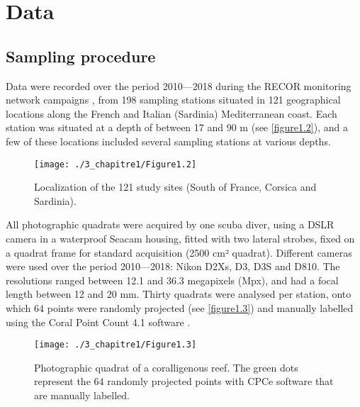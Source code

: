\section{Data}\label{chapitre1_3}

\subsection{Sampling procedure}\label{chapitre1_3.1}
Data were recorded over the period 2010---2018 during the RECOR monitoring network campaigns \citep{andromede-oceanologie_recor_2018}, from 198 sampling stations situated in 121 geographical locations along the French and Italian (Sardinia) Mediterranean coast. Each station was situated at a depth of between 17 and 90 m (see \autoref{figure1.2}), and a few of these locations included several sampling stations at various depths. 

\begin{figure}[H]
	\begin{center}
	\texttt{[image: ./3\_chapitre1/Figure1.2]}
		\caption{Localization of the 121 study sites (South of France, Corsica and Sardinia).}
	\label{figure1.2}
\end{center}
\end{figure}

All photographic quadrats were acquired by one scuba diver, using a DSLR camera in a waterproof Seacam housing, fitted with two lateral strobes, fixed on a quadrat frame for standard acquisition (2500 cm² quadrat). Different cameras were used over the period 2010---2018: Nikon D2Xs, D3, D3S and D810. The resolutions ranged between 12.1 and 36.3 megapixels (Mpx), and had a focal length between 12 and 20 mm. Thirty quadrats were analysed per station, onto which 64 points were randomly projected (see \autoref{figure1.3}) and manually labelled using the Coral Point Count 4.1 \citep{cpce_coral_2011} software \citep{deter_rapid_2012}. 

\begin{figure}[H]
	\begin{center}
	\texttt{[image: ./3\_chapitre1/Figure1.3]}
		\caption[Photographic quadrat of a coralligenous reef]{Photographic quadrat of a coralligenous reef. The green dots represent the 64 randomly projected points with CPCe software that are manually labelled.}
	\label{figure1.3}
\end{center}
\end{figure}

